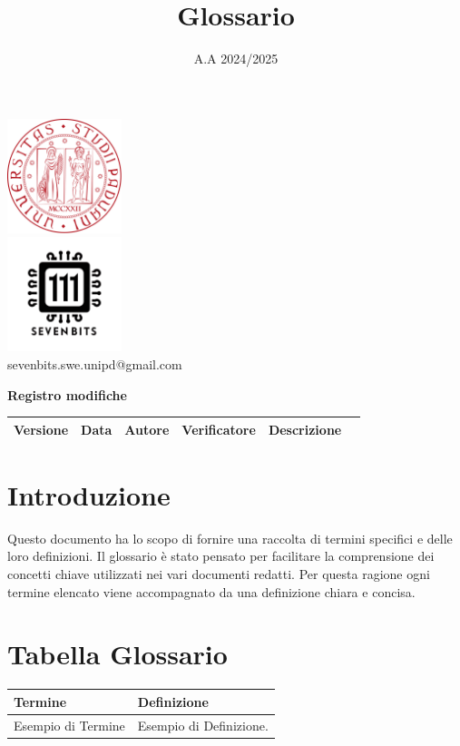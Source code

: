 \documentclass[12pt]{article}
\title{Glossario}
\date{A.A 2024/2025}
\begin{document}
\maketitle
\center 
\includegraphics[width=0.25\textwidth]{LogoUnipd}\\
\includegraphics[width=0.25\textwidth]{Sevenbitslogo}\\
sevenbits.swe.unipd@gmail.com\\
\vspace{2mm}


\textbf{Registro modifiche}\\
\vspace{2mm}
\begin{tabular}{|l|l|l|l|l|l|}
\hline
\textbf{Versione} & \textbf{Data} & \textbf{Autore} & \textbf{Verificatore} & \textbf{Descrizione} \\
\hline
\end{tabular}

\raggedright
\tableofcontents
\newpage

\section{Introduzione}
Questo documento ha lo scopo di fornire una raccolta di termini specifici e delle loro definizioni. Il glossario è stato pensato per facilitare la comprensione dei concetti chiave utilizzati nei vari documenti redatti. Per questa ragione ogni termine elencato viene accompagnato da una definizione chiara e concisa.\\

\section{Tabella Glossario}

\renewcommand{\arraystretch}{1.5} %
\setlength{\tabcolsep}{10pt} %

\begin{tabularx}{\textwidth}{|>{\centering\arraybackslash}l|X|}
\hline
\rowcolor[gray]{0.9}
\textbf{Termine} & \textbf{Definizione}\\
\hline
\setlength{\arrayrulewidth}{0.5mm} %
Esempio di Termine & Esempio di Definizione.\\

\hline
\end{tabularx}
\end{document}
